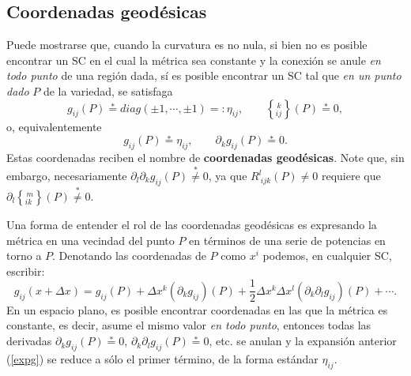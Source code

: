%


\subsection{Coordenadas geodésicas}\label{secCG}

Puede mostrarse que, cuando la curvatura es no nula, si bien no es posible encontrar un SC en el cual la métrica sea constante y la conexión se anule \textit{en todo punto} de una región dada, sí es posible encontrar un SC tal que \textit{en un punto dado} $P$ de la variedad, se satisfaga
\begin{equation}
 g_{ij}(P)\overset{\ast}{=}diag(\pm 1,\cdots,\pm 1)=:\eta_{ij}, \qquad \left\{_{ij}^{\,
k}\right\}(P) \overset{\ast}{=}0,
\end{equation}
o, equivalentemente
\begin{equation}
 g_{ij}(P)\overset{\ast}{=}\eta_{ij}, \qquad \partial_k
g_{ij}(P) \overset{\ast}{=}0. \label{cg1}
\end{equation}
Estas coordenadas reciben el nombre de \textbf{coordenadas geodésicas}.
Note que, sin embargo, necesariamente $\partial_l\partial_k g_{ij}(P)\overset{\ast}{\neq}0$, ya que $R_{\
ijk}^l(P)\neq0$ requiere que $\partial_l\left\{
_{ik}^{\,m}\right\}(P)\overset{\ast}{\neq}0$.

Una forma de entender el rol de las coordenadas geodésicas es expresando la métrica en una vecindad del punto $P$ en términos de una serie de potencias en torno a $P$. Denotando las coordenadas de $P$ como $x^i$ podemos, en cualquier SC, escribir:
\begin{equation}
 g_{ij}(x+\Delta x)=g_{ij}(P)+\Delta x^k(\partial_kg_{ij})(P)+\frac{1}{2}\Delta x^k\Delta x^l(\partial_k\partial_lg_{ij})(P)+\cdots . \label{expg}
\end{equation}
En un espacio plano, es posible encontrar coordenadas en las que la métrica es constante, es decir, asume el mismo valor \textit{en todo punto}, entonces todas las derivadas $\partial_kg_{ij}(P)\stackrel{*}{=}0$, $\partial_k\partial_lg_{ij}(P)\stackrel{*}{=}0$, etc. se anulan y la expansión anterior (\ref{expg}) se reduce a sólo el primer término, de la forma estándar $\eta_{ij}$.

